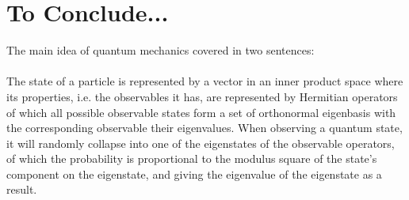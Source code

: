 	\section{To Conclude...}
	The main idea of quantum mechanics covered in two sentences:\\ \\
	The state of a particle is represented by a vector in an inner product space 
	where its properties, i.e. the observables it has, are represented by Hermitian operators 
	of which all possible observable states form a set of orthonormal eigenbasis with the corresponding observable their eigenvalues.
	When observing a quantum state, it will randomly collapse into one of the eigenstates of the observable operators, 
	of which the probability is proportional to the modulus square of the state's component on the eigenstate, 
	and giving the eigenvalue of the eigenstate as a result.